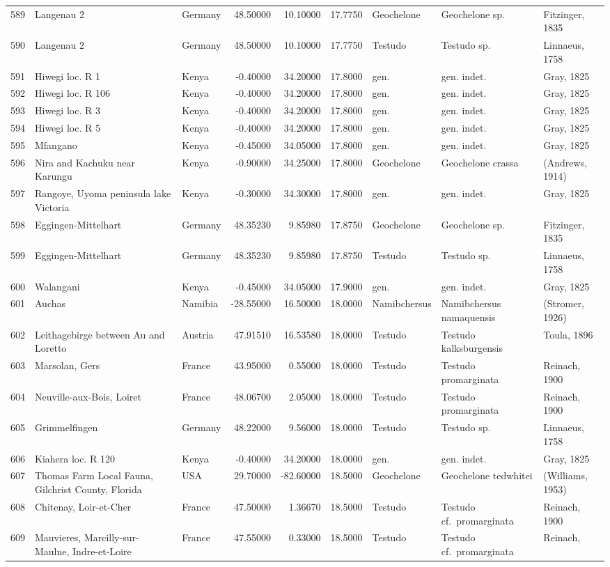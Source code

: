 \documentclass[]{article}
\begin{document}
\begin{longtable}[]{@{}lllrrrlll@{}}
589 & Langenau 2 & Germany & 48.50000 & 10.10000 & 17.7750 & Geochelone
& Geochelone sp. & Fitzinger, 1835\tabularnewline
590 & Langenau 2 & Germany & 48.50000 & 10.10000 & 17.7750 & Testudo &
Testudo sp. & Linnaeus, 1758\tabularnewline
591 & Hiwegi loc. R 1 & Kenya & -0.40000 & 34.20000 & 17.8000 & gen. &
gen. indet. & Gray, 1825\tabularnewline
592 & Hiwegi loc. R 106 & Kenya & -0.40000 & 34.20000 & 17.8000 & gen. &
gen. indet. & Gray, 1825\tabularnewline
593 & Hiwegi loc. R 3 & Kenya & -0.40000 & 34.20000 & 17.8000 & gen. &
gen. indet. & Gray, 1825\tabularnewline
594 & Hiwegi loc. R 5 & Kenya & -0.40000 & 34.20000 & 17.8000 & gen. &
gen. indet. & Gray, 1825\tabularnewline
595 & Mfangano & Kenya & -0.45000 & 34.05000 & 17.8000 & gen. & gen.
indet. & Gray, 1825\tabularnewline
596 & Nira and Kachuku near Karungu & Kenya & -0.90000 & 34.25000 &
17.8000 & Geochelone & Geochelone crassa & (Andrews,
1914)\tabularnewline
597 & Rangoye, Uyoma peninsula lake Victoria & Kenya & -0.30000 &
34.30000 & 17.8000 & gen. & gen. indet. & Gray, 1825\tabularnewline
598 & Eggingen-Mittelhart & Germany & 48.35230 & 9.85980 & 17.8750 &
Geochelone & Geochelone sp. & Fitzinger, 1835\tabularnewline
599 & Eggingen-Mittelhart & Germany & 48.35230 & 9.85980 & 17.8750 &
Testudo & Testudo sp. & Linnaeus, 1758\tabularnewline
600 & Walangani & Kenya & -0.45000 & 34.05000 & 17.9000 & gen. & gen.
indet. & Gray, 1825\tabularnewline
601 & Auchas & Namibia & -28.55000 & 16.50000 & 18.0000 & Namibchersus &
Namibchersus namaquensis & (Stromer, 1926)\tabularnewline
602 & Leithagebirge between Au and Loretto & Austria & 47.91510 &
16.53580 & 18.0000 & Testudo & Testudo kalksburgensis & Toula,
1896\tabularnewline
603 & Marsolan, Gers & France & 43.95000 & 0.55000 & 18.0000 & Testudo &
Testudo promarginata & Reinach, 1900\tabularnewline
604 & Neuville-aux-Bois, Loiret & France & 48.06700 & 2.05000 & 18.0000
& Testudo & Testudo promarginata & Reinach, 1900\tabularnewline
605 & Grimmelfingen & Germany & 48.22000 & 9.56000 & 18.0000 & Testudo &
Testudo sp. & Linnaeus, 1758\tabularnewline
606 & Kiahera loc. R 120 & Kenya & -0.40000 & 34.20000 & 18.0000 & gen.
& gen. indet. & Gray, 1825\tabularnewline
607 & Thomas Farm Local Fauna, Gilchrist County, Florida & USA &
29.70000 & -82.60000 & 18.5000 & Geochelone & Geochelone tedwhitei &
(Williams, 1953)\tabularnewline
608 & Chitenay, Loir-et-Cher & France & 47.50000 & 1.36670 & 18.5000 &
Testudo & Testudo cf.~promarginata & Reinach, 1900\tabularnewline
609 & Mauvieres, Marcilly-sur-Maulne, Indre-et-Loire & France & 47.55000
& 0.33000 & 18.5000 & Testudo & Testudo cf.~promarginata & Reinach,

\end{longtable}
\end{document}
